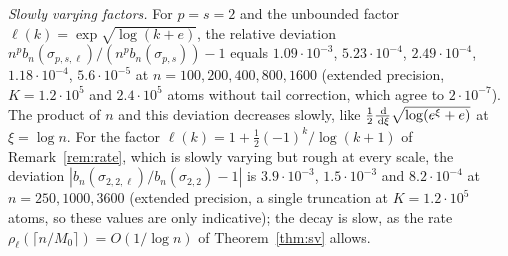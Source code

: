 \emph{Slowly varying factors.} For $p=s=2$ and the unbounded factor $\ell(k)=\exp\sqrt{\log(k+e)}$, the relative
deviation $n^pb_n(\sigma_{p,s,\ell})/(n^pb_n(\sigma_{p,s}))-1$ equals $1.09\cdot10^{-3}$, $5.23\cdot10^{-4}$,
$2.49\cdot10^{-4}$, $1.18\cdot10^{-4}$, $5.6\cdot10^{-5}$ at $n=100,200,400,800,1600$ (extended precision, $K=1.2\cdot10^5$
and $2.4\cdot10^5$ atoms without tail correction, which agree to $2\cdot10^{-7}$). The product of $n$ and this
deviation decreases slowly, like
$\frac12\frac{\,\mathrm{d}}{\,\mathrm{d}\xi}\sqrt{\log(e^\xi+e)}$ at $\xi=\log n$. For the factor $\ell(k)=1+\frac12(-1)^k/\log(k+1)$ of
Remark~\ref{rem:rate}, which is slowly varying but rough at every scale, the deviation $|b_n(\sigma_{2,2,\ell})/b_n(\sigma_{2,2})-1|$
is $3.9\cdot10^{-3}$, $1.5\cdot10^{-3}$ and $8.2\cdot10^{-4}$ at $n=250,1000,3600$ (extended precision, a single truncation
at $K=1.2\cdot10^5$ atoms, so these values are only indicative); the decay is slow, as the rate $\rho_\ell(\lceil
n/M_0\rceil)=O(1/\log n)$ of Theorem~\ref{thm:sv} allows.
